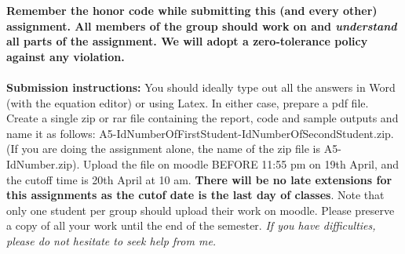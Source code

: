\documentclass[11pt]{article}
\begin{document}
\maketitle

\textbf{Remember the honor code while submitting this (and every other) assignment. All members of the group should work on and \emph{understand} all parts of the assignment. We will adopt a \textbf{zero-tolerance policy} against any violation.}
\\
\\
\textbf{Submission instructions:} You should ideally type out all the answers in Word (with the equation editor) or using Latex. In either case, prepare a pdf file. Create a single zip or rar file containing the report, code and sample outputs and name it as follows: A5-IdNumberOfFirstStudent-IdNumberOfSecondStudent.zip. (If you are doing the assignment alone, the name of the zip file is A5-IdNumber.zip). Upload the file on moodle BEFORE 11:55 pm on 19th April, and the cutoff time is 20th April at 10 am. \textbf{There will be no late extensions for this assignments as the cutof date is the last day of classes}. Note that only one student per group should upload their work on moodle. Please preserve a copy of all your work until the end of the semester. \emph{If you have difficulties, please do not hesitate to seek help from me.} 
\end{document}
